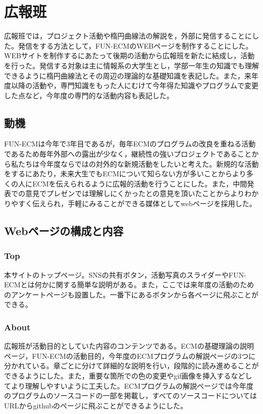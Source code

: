 \documentclass[openany,11pt,papersize]{jsbook}
\begin{document}
\section{広報班}
広報班では，プロジェクト活動や楕円曲線法の解説を，外部に発信することにした。発信をする方法として，FUN-ECMのWEBページを制作することにした。WEBサイトを制作するにあたって後期の活動から広報班を新たに結成し，活動を行った。発信する対象は主に情報系の大学生とし，学部一年生の知識でも理解できるように楕円曲線法とその周辺の理論的な基礎知識を表記した。また，来年度以降の活動や，専門知識をもった人にむけて今年得た知識やプログラムで変更した点など，今年度の専門的な活動内容も表記した。

\subsection{動機}
FUN-ECMは今年で3年目であるが，毎年ECMのプログラムの改良を重ねる活動であるため毎年外部への露出が少なく，継続性の強いプロジェクトであることから私たちは今年度ならではの対外的な新規活動をしたいと考えた。新規的な活動をするにあたり，未来大生でもECMについて知らない方が多いことからより多くの人にECMを伝えられるように広報的活動を行うことにした。また，中間発表での意見でプレゼンでは理解しにくかったとの意見を頂いたことからよりわかりやすく伝えられ，手軽にみることができる媒体としてwebページを採用した。


\subsection{Webページの構成と内容}
\subsubsection{Top}
本サイトのトップページ。SNSの共有ボタン，活動写真のスライダーやFUN-ECMとは何かに関する簡単な説明がある。また，ここでは来年度の活動のためのアンケートページも設置した。一番下にあるボタンから各ページに飛ぶことができる。


\subsubsection{About}
広報班が活動目的としていた内容のコンテンツである。ECMの基礎理論の説明ページ，FUN-ECMの活動目的，今年度のECMプログラムの解説ページの3つに分かれている。章ごとに分けて詳細的な説明を行い，段階的に読み進めることができるようにした。また，重要な箇所での色の変更やgif画像を挿入するなどしてより理解しやすいように工夫した。ECMプログラムの解説ページでは今年度のプログラムのソースコードの一部を掲載し，すべてのソースコードについてはURLからgithubのページに飛ぶことができるようにした。
\end{document}
